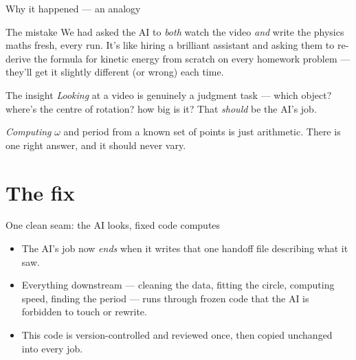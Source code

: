 \documentclass[10pt,aspectratio=169]{beamer}
\newcommand{\gd}[1]{\textcolor{good}{#1}}
\begin{document}
\begin{frame}{Why it happened --- an analogy}
\begin{block}{The mistake}
We had asked the AI to \emph{both} watch the video \emph{and} write the physics maths fresh, every run. It's like hiring a brilliant assistant and asking them to re-derive the formula for kinetic energy from scratch on every homework problem --- they'll get it slightly different (or wrong) each time.
\end{block}
\begin{block}{The insight}
\emph{Looking} at a video is genuinely a judgment task --- which object? where's the centre of rotation? how big is it? That \emph{should} be the AI's job.

\emph{Computing} $\omega$ and period from a known set of points is just arithmetic. There is one right answer, and it should never vary.
\end{block}
\end{frame}

\section{The fix}

\begin{frame}{One clean seam: the AI looks, fixed code computes}
\centering
{}
\par\vspace{0.8em}
\begin{itemize}\footnotesize
  \item The AI's job now \emph{ends} when it writes that one handoff file describing what it saw.
  \item Everything downstream --- cleaning the data, fitting the circle, computing speed, finding the period --- runs through \gd{frozen code that the AI is forbidden to touch or rewrite}.
  \item This code is version-controlled and reviewed once, then copied unchanged into every job.
\end{itemize}
\end{frame}
\end{document}
